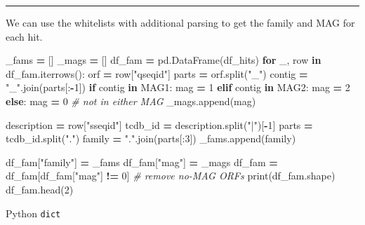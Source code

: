 \documentclass[
]{book}
\newenvironment{Shaded}{\begin{snugshade}}{\end{snugshade}}
\newcommand{\BuiltInTok}[1]{#1}
\newcommand{\CommentTok}[1]{\textcolor[rgb]{0.56,0.35,0.01}{\textit{#1}}}
\newcommand{\ControlFlowTok}[1]{\textcolor[rgb]{0.13,0.29,0.53}{\textbf{#1}}}
\newcommand{\DecValTok}[1]{\textcolor[rgb]{0.00,0.00,0.81}{#1}}
\newcommand{\KeywordTok}[1]{\textcolor[rgb]{0.13,0.29,0.53}{\textbf{#1}}}
\newcommand{\NormalTok}[1]{#1}
\newcommand{\OperatorTok}[1]{\textcolor[rgb]{0.81,0.36,0.00}{\textbf{#1}}}
\newcommand{\StringTok}[1]{\textcolor[rgb]{0.31,0.60,0.02}{#1}}
\begin{document}
\begin{center}\rule{0.5\linewidth}{0.5pt}\end{center}

We can use the whitelists with additional parsing to get the family and MAG for each hit.

\begin{Shaded}
\begin{Highlighting}[numbers=left,,]
\NormalTok{\_fams }\OperatorTok{=}\NormalTok{ []}
\NormalTok{\_mags }\OperatorTok{=}\NormalTok{ []}
\NormalTok{df\_fam }\OperatorTok{=}\NormalTok{ pd.DataFrame(df\_hits)}
\ControlFlowTok{for}\NormalTok{ \_, row }\KeywordTok{in}\NormalTok{ df\_fam.iterrows():}
\NormalTok{    orf }\OperatorTok{=}\NormalTok{ row[}\StringTok{"qseqid"}\NormalTok{]}
\NormalTok{    parts }\OperatorTok{=}\NormalTok{ orf.split(}\StringTok{"\_"}\NormalTok{)}
\NormalTok{    contig }\OperatorTok{=} \StringTok{"\_"}\NormalTok{.join(parts[:}\OperatorTok{{-}}\DecValTok{1}\NormalTok{])}
    \ControlFlowTok{if}\NormalTok{ contig }\KeywordTok{in}\NormalTok{ MAG1:}
\NormalTok{        mag }\OperatorTok{=} \DecValTok{1}
    \ControlFlowTok{elif}\NormalTok{ contig }\KeywordTok{in}\NormalTok{ MAG2:}
\NormalTok{        mag }\OperatorTok{=} \DecValTok{2}
    \ControlFlowTok{else}\NormalTok{:}
\NormalTok{        mag }\OperatorTok{=} \DecValTok{0} \CommentTok{\# not in either MAG}
\NormalTok{    \_mags.append(mag)}

\NormalTok{    description }\OperatorTok{=}\NormalTok{ row[}\StringTok{"sseqid"}\NormalTok{]}
\NormalTok{    tcdb\_id }\OperatorTok{=}\NormalTok{ description.split(}\StringTok{"|"}\NormalTok{)[}\OperatorTok{{-}}\DecValTok{1}\NormalTok{]}
\NormalTok{    parts }\OperatorTok{=}\NormalTok{ tcdb\_id.split(}\StringTok{"."}\NormalTok{)}
\NormalTok{    family }\OperatorTok{=} \StringTok{"."}\NormalTok{.join(parts[:}\DecValTok{3}\NormalTok{])}
\NormalTok{    \_fams.append(family)}

\NormalTok{df\_fam[}\StringTok{"family"}\NormalTok{] }\OperatorTok{=}\NormalTok{ \_fams}
\NormalTok{df\_fam[}\StringTok{"mag"}\NormalTok{] }\OperatorTok{=}\NormalTok{ \_mags}
\NormalTok{df\_fam }\OperatorTok{=}\NormalTok{ df\_fam[df\_fam[}\StringTok{"mag"}\NormalTok{] }\OperatorTok{!=} \DecValTok{0}\NormalTok{] }\CommentTok{\# remove no{-}MAG ORFs}
\BuiltInTok{print}\NormalTok{(df\_fam.shape)}
\NormalTok{df\_fam.head(}\DecValTok{2}\NormalTok{)}
\end{Highlighting}
\end{Shaded}

Python \texttt{dict}
\end{document}
